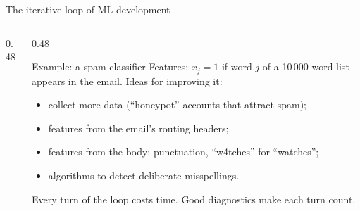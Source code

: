 \documentclass[aspectratio=169,10pt]{beamer}
\begin{document}
\begin{frame}{The iterative loop of ML development}
  \begin{columns}[T,onlytextwidth]
    \begin{column}{0.48\textwidth}
      \centering
    \end{column}
    \begin{column}{0.48\textwidth}
      \footnotesize
      \begin{block}{Example: a spam classifier}
        Features: $x_j=1$ if word $j$ of a 10\,000-word list appears in the email. Ideas
        for improving it:
        \begin{itemize}
          \item collect more data (``honeypot'' accounts that attract spam);
          \item features from the email's routing headers;
          \item features from the body: punctuation, ``w4tches'' for ``watches'';
          \item algorithms to detect deliberate misspellings.
        \end{itemize}
      \end{block}
      \begin{keyidea}
        Every turn of the loop costs time. Good diagnostics make each turn count.
      \end{keyidea}
    \end{column}
  \end{columns}
\end{frame}
\end{document}
